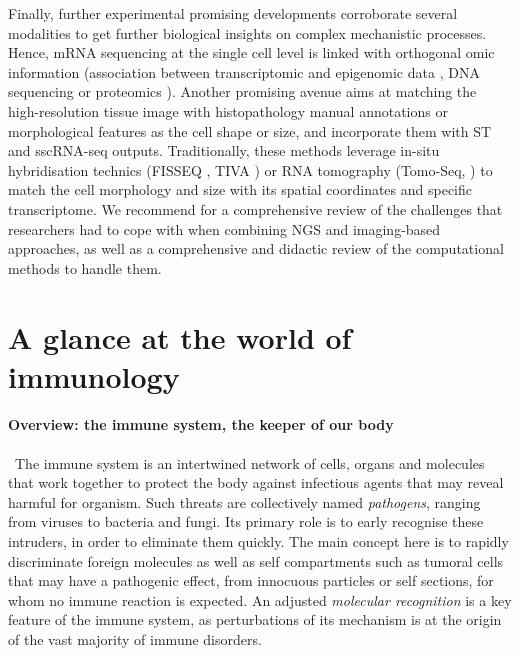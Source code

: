 Finally, further experimental promising developments corroborate several modalities to get further biological insights on complex mechanistic processes. Hence, mRNA sequencing at the single cell level is linked with orthogonal omic information (association between transcriptomic and epigenomic data \autocite{smallwood_etal14}, DNA sequencing \autocite{dey_etal15} or proteomics \autocite{amir_etal13}). Another promising avenue aims at matching the high-resolution tissue image with histopathology manual annotations or morphological features as the cell shape or size, and incorporate them with ST and sscRNA-seq outputs. Traditionally, these methods leverage in-situ hybridisation technics (FISSEQ \autocite{lee_etal14}, TIVA \autocite{lovatt_etal14}) or RNA tomography (Tomo-Seq, \autocite{holler_junker19}) to match the cell morphology and size with its spatial coordinates and specific transcriptome.  We recommend \autocite {longo_etal21} for a comprehensive review of the challenges that researchers had to cope with when combining NGS and imaging-based approaches, as well as a comprehensive and didactic review of the computational methods to handle them.



\section{A glance at the world of immunology}
\label{sec:immunology}

\paragraph{Overview: the  immune system, the keeper of our body} 
\
The immune system is an intertwined network of cells, organs and molecules that work together to protect the body against infectious agents that may reveal harmful for organism. Such threats are collectively named \textit{pathogens}, ranging from viruses to bacteria and fungi. Its primary role is to early recognise these intruders, in order to eliminate them quickly. The main concept here is to rapidly discriminate foreign molecules as well as self compartments such as tumoral cells that may have a pathogenic effect, from innocuous particles or self sections, for whom no immune reaction is expected. An adjusted \textit{molecular recognition} is a key feature of the immune system, as perturbations of its mechanism is at the origin of the vast majority of immune disorders. 

